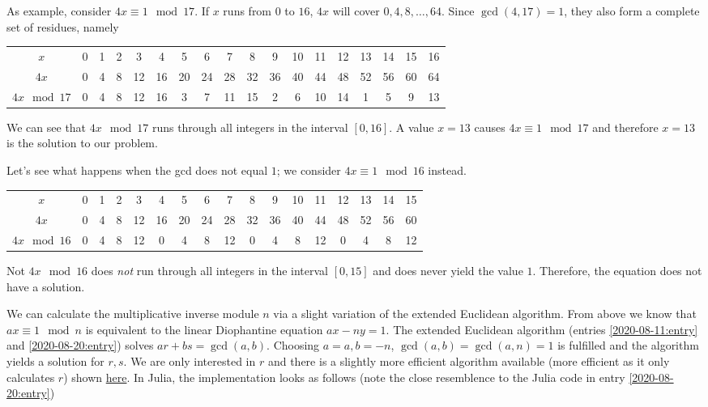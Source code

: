 As example, consider $4x \equiv 1 \mod 17$. If $x$ runs from $0$ to $16$, $4x$ will cover $0, 4, 8,\ldots, 64$. Since $\gcd(4, 17)=1$, they also form a complete set of residues, namely

\vspace*{3mm}

\begin{tabular}{c|ccccccccccccccccc}
 $x$ & 0 & 1& 2& 3& 4& 5& 6& 7& 8& 9& 10& 11& 12& 13& 14& 15& 16 \\
 $4x$ & 0& 4& 8& 12& 16& 20& 24& 28& 32& 36& 40& 44& 48& 52& 56& 60& 64 \\
 $4x \mod 17$ & 0& 4& 8& 12& 16& 3& 7& 11& 15& 2& 6& 10& 14& 1& 5& 9& 13 \\
\end{tabular}

\vspace*{3mm}

We can see that $4x \mod 17$ runs through all integers in the interval $[0, 16]$. A value $x = 13$ causes $4x \equiv 1 \mod 17$ and therefore $x = 13$ is the solution to our problem.

Let's see what happens when the gcd does not equal $1$; we consider $4x \equiv 1 \mod 16$ instead.

\vspace*{3mm}

\begin{tabular}{c|cccccccccccccccc}
 $x$ & 0& 1& 2& 3& 4& 5& 6& 7& 8& 9& 10& 11& 12& 13& 14& 15 \\
 $4x$ & 0& 4& 8& 12& 16& 20& 24& 28& 32& 36& 40& 44& 48& 52& 56& 60 \\
 $4x \mod 16$ & 0& 4& 8& 12& 0& 4& 8& 12& 0& 4& 8& 12& 0& 4& 8& 12 \\
\end{tabular}

\vspace*{3mm}

Not $4x \mod 16$ does \emph{not} run through all integers in the interval $[0, 15]$ and does never yield the value $1$. Therefore, the equation does not have a solution.


We can calculate the multiplicative inverse module $n$ via a slight variation of the extended Euclidean algorithm. From above we know that $ax \equiv 1 \mod n$ is equivalent to the linear Diophantine equation $ax - ny = 1$. The extended Euclidean algorithm (entries \ref{2020-08-11:entry} and \ref{2020-08-20:entry}) solves $ar + bs = \gcd(a,b)$. Choosing $a = a, b = -n$, $\gcd(a,b) = \gcd(a, n) = 1$ is fulfilled and the algorithm yields a solution for $r,s$. We are only interested in $r$ and there is a slightly more efficient algorithm available (more efficient as it only calculates $r$) shown \href{https://en.wikipedia.org/wiki/Extended_Euclidean_algorithm}{here}. In Julia, the implementation looks as follows (note the close resemblence to the Julia code in entry \ref{2020-08-20:entry})

